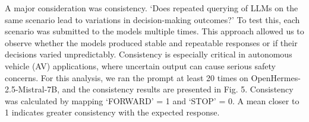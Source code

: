 \documentclass[conference]{IEEEtran}
\begin{document}
A major consideration was consistency. `Does repeated querying of LLMs on the same scenario lead to variations in decision-making outcomes?' To test this, each scenario was submitted to the models multiple times. This approach allowed us to observe whether the models produced stable and repeatable responses or if their decisions varied unpredictably. Consistency is especially critical in autonomous vehicle (AV) applications, where uncertain output can cause serious safety concerns. For this analysis, we ran the prompt at least 20 times on OpenHermes-2.5-Mistral-7B, and the consistency results are presented in Fig. 5. Consistency was calculated by mapping `FORWARD' = 1 and `STOP' = 0. A mean closer to 1 indicates greater consistency with the expected response.



\end{document}
